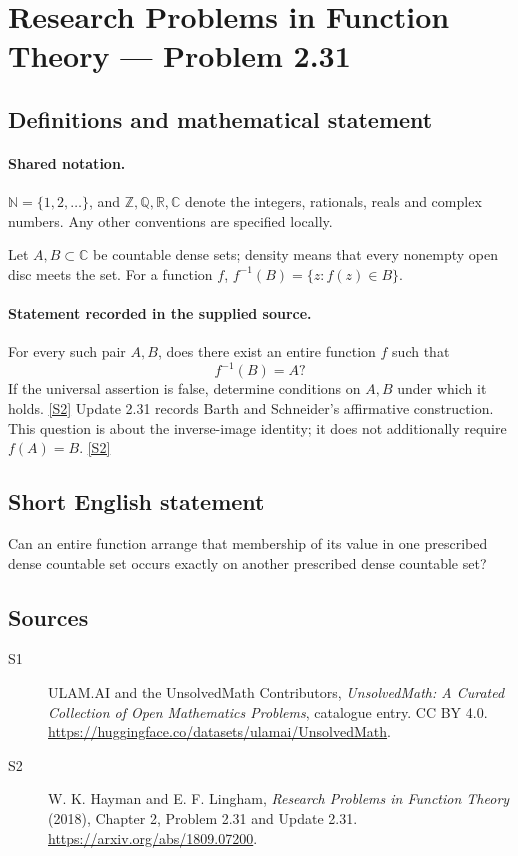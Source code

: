 \documentclass[11pt]{article}
\newcommand{\sref}[2]{\hyperlink{source:#1:#2}{[S#2]}}
\begin{document}
\section{Research Problems in Function Theory — Problem 2.31}\label{statement}

\subsection{Definitions and mathematical statement}

\paragraph{Shared notation.}$\mathbb N=\{1,2,\ldots\}$, and $\mathbb Z,\mathbb Q,\mathbb R,\mathbb C$ denote the integers, rationals, reals and complex numbers. Any other conventions are specified locally.


Let $A,B\subset\mathbb C$ be countable dense sets; density means that every nonempty open disc meets the set. For a function $f$, $f^{-1}(B)=\{z:f(z)\in B\}$.

\paragraph{Statement recorded in the supplied source.}
For every such pair $A,B$, does there exist an entire function $f$ such that
\[f^{-1}(B)=A?\]
If the universal assertion is false, determine conditions on $A,B$ under which it holds. \sref{statement}{2}
Update 2.31 records Barth and Schneider's affirmative construction. This question is about the inverse-image identity; it does not additionally require $f(A)=B$. \sref{statement}{2}
\subsection{Short English statement}
Can an entire function arrange that membership of its value in one prescribed dense countable set occurs exactly on another prescribed dense countable set?
\subsection{Sources}
\begin{description}
\item[\hypertarget{source:statement:1}{S1}] ULAM.AI and the UnsolvedMath Contributors, \emph{UnsolvedMath: A Curated Collection of Open Mathematics Problems}, catalogue entry. CC BY 4.0. \url{https://huggingface.co/datasets/ulamai/UnsolvedMath}.
\item[\hypertarget{source:statement:2}{S2}] W. K. Hayman and E. F. Lingham, \emph{Research Problems in Function Theory} (2018), Chapter 2, Problem 2.31 and Update 2.31. \url{https://arxiv.org/abs/1809.07200}.
\end{description}
\label{end:statement}
\end{document}
